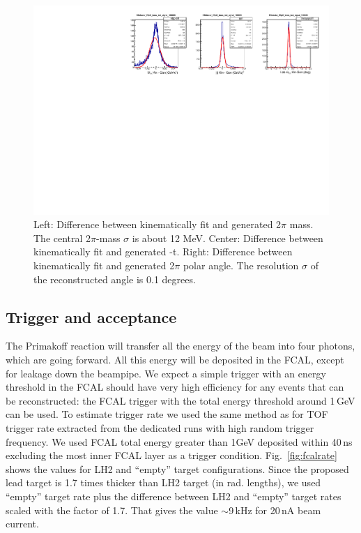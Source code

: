 \begin{figure}[tph]
\centering
\includegraphics[width=6in]{figures/Resolution_Mpipittag_signal_DSelector.pdf}
\caption{Left: Difference between kinematically fit and generated 2$\pi$ mass. The central 2$\pi$-mass $\sigma$ is about 12 MeV. Center: Difference between kinematically fit and generated -t. Right: Difference between kinematically fit and generated 2$\pi$ polar angle. The resolution $\sigma$ of the reconstructed angle is 0.1 degrees.
\label{fig:Resolution_Mpipittag_signal_DSelector}}
\end{figure}

\subsection{Trigger and acceptance}
The Primakoff reaction will transfer all the energy of the beam into
four photons, which are going forward. All this energy will be
deposited in the FCAL, except for leakage down the beampipe. We expect
a simple trigger with an energy threshold in the FCAL should have very
high efficiency for any events that can be reconstructed:
the FCAL trigger with the total energy threshold around 1$\,$GeV can be used. To estimate trigger rate we used the same method as for TOF trigger rate \cite{TOFrate} extracted from the dedicated runs with high random trigger frequency. We used FCAL total energy greater than 1GeV deposited within 40$\,$ns excluding the most inner FCAL layer as a trigger condition. Fig.~\ref{fig:fcalrate} shows the values for LH2 and ``empty'' target configurations.
Since the proposed lead target is 1.7 times thicker than LH2 target (in rad. lengths), we used ``empty'' target rate plus the difference between LH2 and ``empty'' target rates scaled with the factor of 1.7. That gives the value $\sim$9$\,$kHz for 20$\,$nA beam current.

